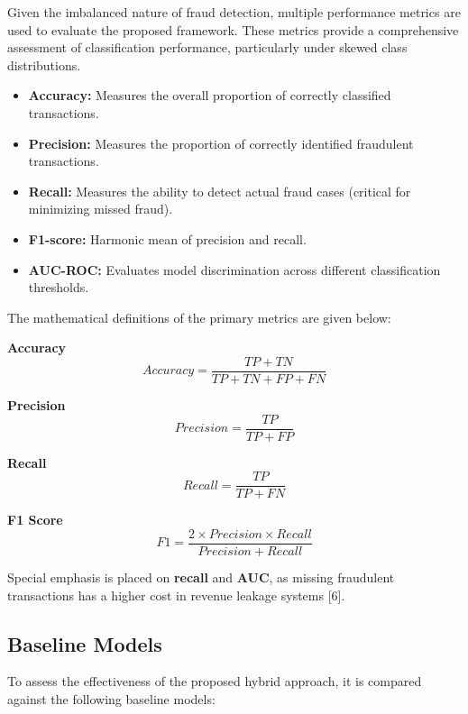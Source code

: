 \documentclass[conference]{IEEEtran}
\begin{document}
Given the imbalanced nature of fraud detection, multiple performance metrics are used to evaluate the proposed framework. These metrics provide a comprehensive assessment of classification performance, particularly under skewed class distributions.

\begin{itemize}
    \item \textbf{Accuracy:} Measures the overall proportion of correctly classified transactions.
    \item \textbf{Precision:} Measures the proportion of correctly identified fraudulent transactions.
    \item \textbf{Recall:} Measures the ability to detect actual fraud cases (critical for minimizing missed fraud).
    \item \textbf{F1-score:} Harmonic mean of precision and recall.
    \item \textbf{AUC-ROC:} Evaluates model discrimination across different classification thresholds.
\end{itemize}

The mathematical definitions of the primary metrics are given below:

\textbf{Accuracy}
\begin{equation}
Accuracy = \frac{TP + TN}{TP + TN + FP + FN}
\end{equation}

\textbf{Precision}
\begin{equation}
Precision = \frac{TP}{TP + FP}
\end{equation}

\textbf{Recall}
\begin{equation}
Recall = \frac{TP}{TP + FN}
\end{equation}

\textbf{F1 Score}
\begin{equation}
F1 = \frac{2 \times Precision \times Recall}{Precision + Recall}
\end{equation}

Special emphasis is placed on \textbf{recall} and \textbf{AUC}, as missing fraudulent transactions has a higher cost in revenue leakage systems [6].

\subsection{Baseline Models}

To assess the effectiveness of the proposed hybrid approach, it is compared against the following baseline models:
\end{document}
